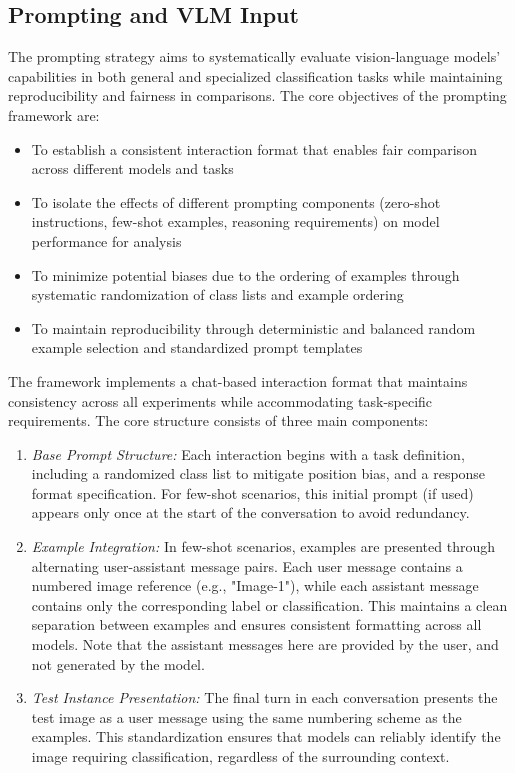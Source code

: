 \documentclass[../ShajiS_RnDReport.tex]{subfiles}
\begin{document}
\subsection{Prompting and VLM Input}
The prompting strategy aims to systematically evaluate vision-language models' capabilities in both general and specialized classification tasks while maintaining reproducibility and fairness in comparisons. The core objectives of the prompting framework are:
\begin{itemize}
    \item To establish a consistent interaction format that enables fair comparison across different models and tasks
    \item To isolate the effects of different prompting components (zero-shot instructions, few-shot examples, reasoning requirements) on model performance for analysis
    \item To minimize potential biases due to the ordering of examples through systematic randomization of class lists and example ordering
    \item To maintain reproducibility through deterministic and balanced random example selection and standardized prompt templates
\end{itemize}

The framework implements a chat-based interaction format that maintains consistency across all experiments while accommodating task-specific requirements. The core structure consists of three main components:

    \begin{enumerate}
    \item \emph{Base Prompt Structure:} Each interaction begins with a task definition, including a randomized class list to mitigate position bias, and a response format specification. For few-shot scenarios, this initial prompt (if used) appears only once at the start of the conversation to avoid redundancy.

    \item \emph{Example Integration:} In few-shot scenarios, examples are presented through alternating user-assistant message pairs. Each user message contains a numbered image reference (e.g., "Image-1"), while each assistant message contains only the corresponding label or classification. This maintains a clean separation between examples and ensures consistent formatting across all models. Note that the assistant messages here are provided by the user, and not generated by the model.

    \item \emph{Test Instance Presentation:} The final turn in each conversation presents the test image as a user message using the same numbering scheme as the examples. This standardization ensures that models can reliably identify the image requiring classification, regardless of the surrounding context.
    \end{enumerate}
\end{document}
